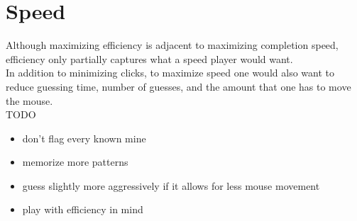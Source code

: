 \section{Speed}

Although maximizing efficiency is adjacent to maximizing completion speed, efficiency only partially captures what a speed player would want.\\

In addition to minimizing clicks, to maximize speed one would also want to reduce guessing time, number of guesses, and the amount that one has to move the mouse.\\

TODO

\begin{itemize}
    \item don't flag every known mine
    \item memorize more patterns
    \item guess slightly more aggressively if it allows for less mouse movement
    \item play with efficiency in mind
\end{itemize}